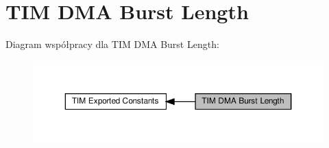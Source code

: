 \hypertarget{group___t_i_m___d_m_a___burst___length}{}\section{T\+IM D\+MA Burst Length}
\label{group___t_i_m___d_m_a___burst___length}
Diagram współpracy dla T\+IM D\+MA Burst Length\+:\nopagebreak
\begin{figure}[H]
\begin{center}
\leavevmode
\includegraphics[width=350pt]{group___t_i_m___d_m_a___burst___length}
\end{center}
\end{figure}
